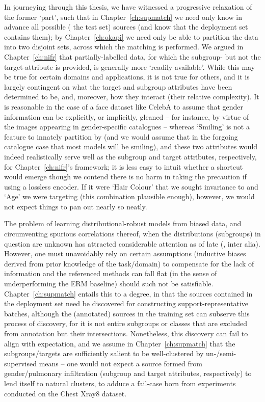 %
In journeying through this thesis, we have witnessed a progressive relaxation of the former `part',
such that in Chapter~\ref{ch:supmatch} we need only know in advance all possible (\wrt{} the test
set) sources (and know that the deployment set contains them); by Chapter~\ref{ch:okapi} we need
only be able to partition the data into two disjoint sets, across which the matching is performed.
%
We argued in Chapter~\ref{ch:nifr} that partially-labelled data, for which the subgroup- but not
the target-attribute is provided, is generally more `readily available'. 
%
While this may be true for certain domains and applications, it is not true for others, and it is
largely contingent on what the target and subgroup attributes have been determined to be, and,
moreover, how they interact (their relative complexity).
%
It is reasonable in the case of a face dataset like CelebA to assume that gender information can be
explicitly, or implicitly, gleaned -- for instance, by virtue of the images appearing in
gender-specific catalogues -- whereas `Smiling' is not a feature to innately partition by (and we
would assume that in the forgoing catalogue case that most models will be smiling), and these two
attributes would indeed realistically serve well as the subgroup and target attributes,
respectively, for Chapter~\ref{ch:nifr}'s framework; it is less easy to intuit whether a shortcut
would emerge though we contend there is no harm in taking the precaution if using a lossless
encoder.
%
If it were `Hair Colour' that we sought invariance to and `Age' we were targeting (this combination
plausible enough), however, we would not expect things to pan out nearly so neatly.

%
The problem of learning distributional-robust models from biased data, and circumventing spurious
correlations thereof, when the distributions (subgroups) in question are unknown has attracted
considerable attention as of late (\cite{HasSriNamLia18, SohDunAngGuetal20, creager2021environment,
liu2021just, pezeshki2021gradient, taghanaki2022masktune, kim2022learning}, inter alia).
%
However, one must unavoidably rely on certain assumptions (inductive biases derived from prior
knowledge of the task/domain) to compensate for the lack of information and the referenced methods
can fall flat (in the sense of underperforming the ERM baseline) should such not be satisfiable.
%
Chapter~\ref{ch:supmatch} entails this to a degree, in that the sources contained in the deployment
set need be discovered for constructing support-representative batches, although the (annotated)
sources in the training set can subserve this process of discovery, for it is not entire subgroups
or classes that are excluded from annotation but their intersections.
%
Nonetheless, this discovery can fail to align with expectation, and we assume in
Chapter~\ref{ch:supmatch} that the subgroups/targets are sufficiently salient to be well-clustered
by un-/semi-supervised means -- one would not expect a source formed from gender/pulmonary
infiltration (subgroup and target attributes, respectively) to lend itself to natural clusters, to
adduce a fail-case born from experiments conducted on the Chest Xray8 dataset. 

